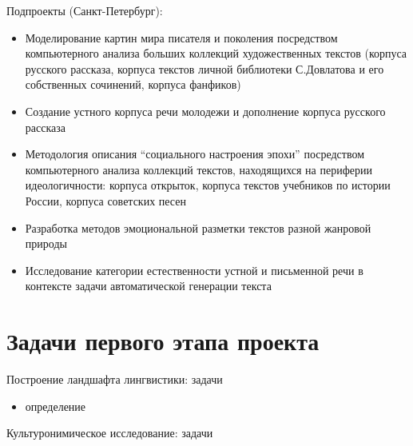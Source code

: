\documentclass[
  13pt,
  ignorenonframetext,
]{beamer}
\providecommand{\tightlist}{%
  \setlength{\itemsep}{0pt}\setlength{\parskip}{0pt}}\usepackage{longtable,booktabs,array}
\begin{document}
\begin{frame}{Подпроекты (Санкт-Петербург):}
\label{ux43fux43eux434ux43fux440ux43eux435ux43aux442ux44b-ux441ux430ux43dux43aux442-ux43fux435ux442ux435ux440ux431ux443ux440ux433}
\begin{itemize}
\tightlist
\item
  Моделирование картин мира писателя и поколения посредством
  компьютерного анализа больших коллекций художественных текстов
  (корпуса русского рассказа, корпуса текстов личной библиотеки
  С.Довлатова и его собственных сочинений, корпуса фанфиков)
\item
  Создание устного корпуса речи молодежи и дополнение корпуса русского
  рассказа
\item
  Методология описания ``социального настроения эпохи'' посредством
  компьютерного анализа коллекций текстов, находящихся на периферии
  идеологичности: корпуса открыток, корпуса текстов учебников по истории
  России, корпуса советских песен
\item
  Разработка методов эмоциональной разметки текстов разной жанровой
  природы
\item
  Исследование категории естественности устной и письменной речи в
  контексте задачи автоматической генерации текста
\end{itemize}
\end{frame}

\section{Задачи первого этапа
проекта}\label{ux437ux430ux434ux430ux447ux438-ux43fux435ux440ux432ux43eux433ux43e-ux44dux442ux430ux43fux430-ux43fux440ux43eux435ux43aux442ux430}

\begin{frame}{Построение ландшафта лингвистики: задачи}
\label{ux43fux43eux441ux442ux440ux43eux435ux43dux438ux435-ux43bux430ux43dux434ux448ux430ux444ux442ux430-ux43bux438ux43dux433ux432ux438ux441ux442ux438ux43aux438-ux437ux430ux434ux430ux447ux438}
\begin{itemize}
\tightlist
\item
  определение
\end{itemize}
\end{frame}

\begin{frame}{Культуронимическое исследование: задачи}
\label{ux43aux443ux43bux44cux442ux443ux440ux43eux43dux438ux43cux438ux447ux435ux441ux43aux43eux435-ux438ux441ux441ux43bux435ux434ux43eux432ux430ux43dux438ux435-ux437ux430ux434ux430ux447ux438}
\end{frame}
\end{document}

